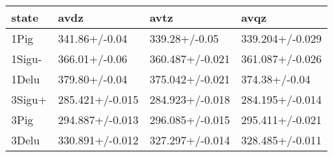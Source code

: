 \begin{tabular}{llll}
\toprule
state & avdz & avtz & avqz \\
\midrule
1Pig & 341.86+/-0.04 & 339.28+/-0.05 & 339.204+/-0.029 \\
1Sigu- & 366.01+/-0.06 & 360.487+/-0.021 & 361.087+/-0.026 \\
1Delu & 379.80+/-0.04 & 375.042+/-0.021 & 374.38+/-0.04 \\
3Sigu+ & 285.421+/-0.015 & 284.923+/-0.018 & 284.195+/-0.014 \\
3Pig & 294.887+/-0.013 & 296.085+/-0.015 & 295.411+/-0.021 \\
3Delu & 330.891+/-0.012 & 327.297+/-0.014 & 328.485+/-0.011 \\
\bottomrule
\end{tabular}
